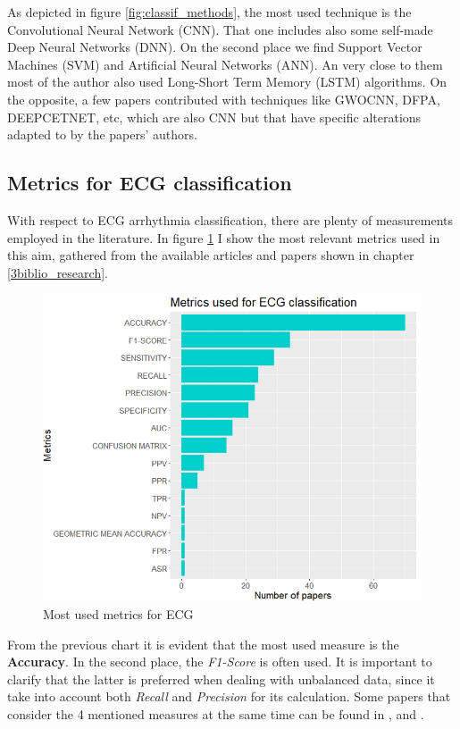 As depicted in figure \ref{fig:classif_methods}, the most used technique is the Convolutional Neural Network (CNN). That one includes also some self-made Deep Neural Networks (DNN). On the second place we find Support Vector Machines (SVM) and Artificial Neural Networks (ANN). An very close to them most of the author also used Long-Short Term Memory (LSTM) algorithms. On the opposite, a few papers contributed with techniques like GWOCNN, DFPA, DEEPCETNET, etc, which are also CNN but that have specific alterations adapted to by the papers' authors.

\subsection{Metrics for ECG classification}\label{chap3metrics}

With respect to ECG arrhythmia classification, there are plenty of measurements employed in the literature. In figure \ref{fig:metrics_ECG} I show the most relevant metrics used in this aim, gathered from the available articles and papers shown in chapter \ref{3biblio_research}. 

 \begin{figure}[H]
\centering
\includegraphics[scale=0.48]{img/metrics_ECG.PNG}
\caption{Most used metrics for ECG}
\label{fig:metrics_ECG}
\end{figure}

From the previous chart it is evident that the most used measure is the \textbf{Accuracy}. In the second place, the \textit{F1-Score} is often used. It is important to clarify that the latter is preferred when dealing with unbalanced data, since it take into account both \textit{Recall} and \textit{Precision} for its calculation. Some papers that consider the 4 mentioned measures at the same time can be found in \cite{metrics_ecg1}, 
\cite{metrics_ecg2} and \cite{metrics_ecg3}.


